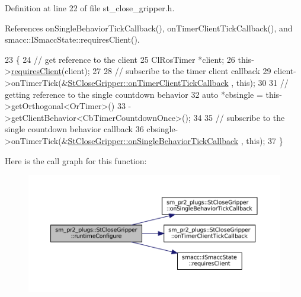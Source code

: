 Definition at line 22 of file st\+\_\+close\+\_\+gripper.\+h.



References on\+Single\+Behavior\+Tick\+Callback(), on\+Timer\+Client\+Tick\+Callback(), and smacc\+::\+I\+Smacc\+State\+::requires\+Client().


\begin{DoxyCode}
23     \{
24         \textcolor{comment}{// get reference to the client}
25         ClRosTimer *client;
26         this->\hyperlink{classsmacc_1_1ISmaccState_a7f95c9f0a6ea2d6f18d1aec0519de4ac}{requiresClient}(client);
27 
28         \textcolor{comment}{// subscribe to the timer client callback}
29         client->onTimerTick(&\hyperlink{structsm__pr2__plugs_1_1StCloseGripper_a05a1de398b611d66e20f3595c6f0f8a6}{StCloseGripper::onTimerClientTickCallback}
      , \textcolor{keyword}{this});
30 
31         \textcolor{comment}{// getting reference to the single countdown behavior}
32         \textcolor{keyword}{auto} *cbsingle = this->getOrthogonal<OrTimer>()
33                              ->getClientBehavior<CbTimerCountdownOnce>();
34 
35         \textcolor{comment}{// subscribe to the single countdown behavior callback}
36         cbsingle->onTimerTick(&\hyperlink{structsm__pr2__plugs_1_1StCloseGripper_a34d9b8e32da01b35c731fbbdf3edca69}{StCloseGripper::onSingleBehaviorTickCallback}
      , \textcolor{keyword}{this});
37     \}
\end{DoxyCode}
Here is the call graph for this function\+:
\nopagebreak
\begin{figure}[H]
\begin{center}
\leavevmode
\includegraphics[width=350pt]{structsm__pr2__plugs_1_1StCloseGripper_aaad13a14b27b9e31bd14aa932c191d57_cgraph}
\end{center}
\end{figure}
\mbox{\label{structsm__pr2__plugs_1_1StCloseGripper_a72d68b4e2478674f5022f93ce881bbd6}} 
